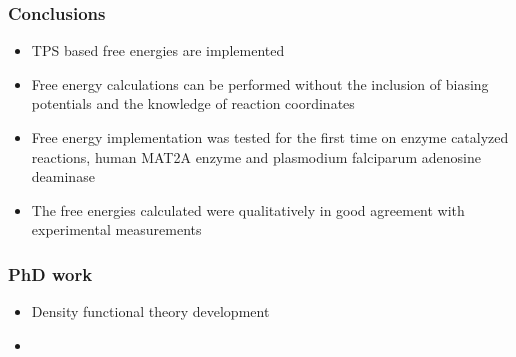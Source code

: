 \documentclass{beamer}
\begin{document}
\begin{frame}
\frametitle{Conclusions}
\begin{block}
{
    \begin{itemize}[<+-|alert@+>]
        \item  TPS based free energies are implemented 
        \item  Free energy calculations can be performed without the inclusion of 
        biasing potentials and the knowledge of reaction coordinates
        \item Free energy implementation was tested for the first time on enzyme catalyzed
        reactions, human MAT2A enzyme and plasmodium falciparum adenosine deaminase 
        \item The free energies calculated were qualitatively in good agreement with experimental
        measurements 
    \end{itemize}
}
\end{block}
\end{frame}
\begin{frame}
\frametitle{PhD work}
\begin{itemize}
\item Density functional theory development 
\item 
\end{itemize}  
\end{frame}
\end{document}
